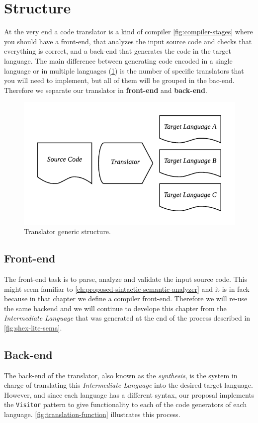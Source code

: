 \section{Structure}
At the very end a code translator is a kind of compiler \cref{fig:compiler-stages} where you should have a front-end, that
analyzes the input source code and checks that everything is correct, and a back-end that
generates the code in the target language. The main difference between generating code encoded
in a single language or in multiple languages (\cref{fig:translator}) is the number of specific translators that you will need to
implement, but all of them will be grouped in the bac-end. Therefore we separate our
translator in \textbf{front-end} and \textbf{back-end}.

\begin{figure}
    \includegraphics{images/translator.pdf}
    \centering
	\caption[Translator generic structure]{Translator generic structure.}
    \label{fig:translator}
\end{figure}

\subsection{Front-end}
The front-end task is to parse, analyze and validate the input source code. This might seem familiar to
\cref{ch:proposed-sintactic-semantic-analyzer} and it is in fack because in that chapter we define
a compiler front-end. Therefore we will re-use the same backend and we will continue to develope this
chapter from the \textit{Intermediate Language} that was generated at the end of the process described in
\cref{fig:shex-lite-sema}.

\subsection{Back-end}
The back-end of the translator, also known as the \textit{synthesis}, is the system in charge of translating this
\textit{Intermediate Language} into the desired target language. However, and since each language has a different
syntax, our proposal implements the \texttt{Visitor} pattern to give functionality to each of the code generators of each
language. \cref{fig:translation-function} illustrates this process.

